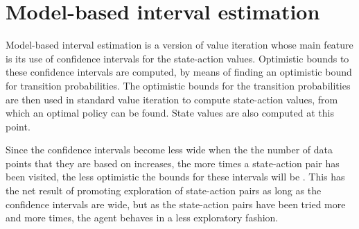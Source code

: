 \section{Model-based interval estimation}
\label{sec:mbie}

Model-based interval estimation is a version of value iteration whose main
feature is its use of confidence intervals for the state-action values.
Optimistic bounds to these confidence intervals are computed, by means of
finding an optimistic bound for transition probabilities. The optimistic bounds
for the transition probabilities are then used in standard value iteration to
compute state-action values, from which an optimal policy can be found. State
values are also computed at this point.

Since the confidence intervals become less wide when the the number of data
points that they are based on increases, the more times a state-action pair
has been visited, the less optimistic the bounds for these intervals will be
\parencite{dietterich2013pac}. This has the net result of promoting
exploration of state-action pairs as long as the confidence intervals are
wide, but as the state-action pairs have been tried more and more times, the
agent behaves in a less exploratory fashion. 


\begin{comment}
Model-based interval estimation is a modification of value iteration whose main feature is its  addition of confidence
intervals to the state-action values. These confidence intervals allow the agent to choose between
actions, based on how confident it is about its evaluation of them. In effect,
the less certain the agent is about its evaluation of the states and actions,
the more exploratory the actions will be. When the agent is more confident
however, it will exploit what it has learned so far about the MDP
\parencite{dietterich2013pac}.
\end{comment}





